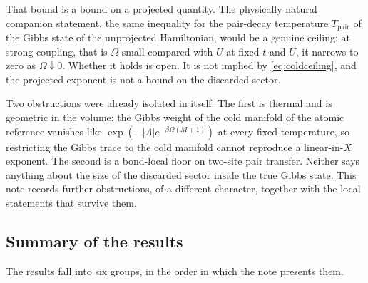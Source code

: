 \documentclass[11pt]{article}
\theoremstyle{definition}
\theoremstyle{remark}
\newcommand{\Tpair}{T_{\mathrm{pair}}}
\begin{document}
That bound is a bound on a projected quantity. The physically natural companion
statement, the same inequality for the pair-decay temperature $\Tpair$ of the
Gibbs state of the unprojected Hamiltonian, would be a genuine ceiling: at strong
coupling, that is $\Omega$ small compared with $U$ at fixed $t$ and $U$, it
narrows to zero as $\Omega\downarrow0$. Whether it holds is open. It is not
implied by \eqref{eq:coldceiling}, and the projected exponent is not a bound on
the discarded sector.

Two obstructions were already isolated in \cite{largeu} itself. The first is
thermal and is geometric in the volume: the Gibbs weight of the cold manifold of
the atomic reference vanishes like
$\exp(-|\Lambda|e^{-\beta\Omega(M+1)})$ at every fixed temperature, so restricting
the Gibbs trace to the cold manifold cannot reproduce a linear-in-$X$ exponent.
The second is a bond-local floor on two-site pair transfer. Neither says
anything about the size of the discarded sector inside the true Gibbs state. This
note records further obstructions, of a different character, together with
the local statements that survive them.

\subsection{Summary of the results}

The results fall into six groups, in the order in which the note presents them.
\end{document}
